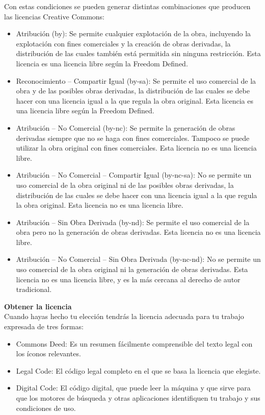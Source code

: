 Con estas condiciones se pueden generar distintas combinaciones que producen las licencias Creative Commons:

\begin{itemize}
\item Atribución (by): Se permite cualquier explotación de la obra, incluyendo la explotación con fines comerciales y la creación de obras derivadas, la distribución de las cuales también está permitida sin ninguna restricción. Esta licencia es una licencia libre según la Freedom Defined.
\item Reconocimiento – Compartir Igual (by-sa): Se permite el uso comercial de la obra y de las posibles obras derivadas, la distribución de las cuales se debe hacer con una licencia igual a la que regula la obra original. Esta licencia es una licencia libre según la Freedom Defined.
\item Atribución – No Comercial (by-nc): Se permite la generación de obras derivadas siempre que no se haga con fines comerciales. Tampoco se puede utilizar la obra original con fines comerciales. Esta licencia no es una licencia libre.
\item Atribución – No Comercial – Compartir Igual (by-nc-sa): No se permite un uso comercial de la obra original ni de las posibles obras derivadas, la distribución de las cuales se debe hacer con una licencia igual a la que regula la obra original. Esta licencia no es una licencia libre.
\item Atribución – Sin Obra Derivada (by-nd): Se permite el uso comercial de la obra pero no la generación de obras derivadas. Esta licencia no es una licencia libre.
\item Atribución – No Comercial – Sin Obra Derivada (by-nc-nd): No se permite un uso comercial de la obra original ni la generación de obras derivadas. Esta licencia no es una licencia libre, y es la más cercana al derecho de autor tradicional.
\end{itemize}

{\bf Obtener la licencia}\\

Cuando hayas hecho tu elección tendrás la licencia adecuada para tu trabajo expresada de tres formas:

\begin{itemize}
\item Commons Deed: Es un resumen fácilmente comprensible del texto legal con los íconos relevantes.
\item Legal Code: El código legal completo en el que se basa la licencia que elegiste.
\item Digital Code: El código digital, que puede leer la máquina y que sirve para que los motores de búsqueda y otras aplicaciones identifiquen tu trabajo y sus condiciones de uso.
\end{itemize}

